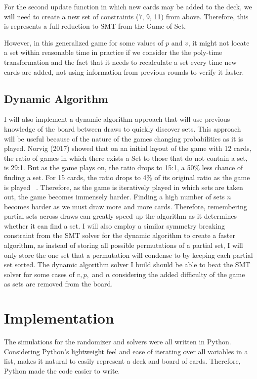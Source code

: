 \documentclass[pageno]{jpaper}
\begin{document}
For the second update function in which new cards may be added to the deck, we will need to create a new set of constraints (7, 9, 11) from above. Therefore, this is represents a full reduction to SMT from the Game of Set. 

However, in this generalized game for some values of $p$ and $v$, it might not locate a set within reasonable time in practice if we consider the the poly-time transformation and the fact that it needs to recalculate a set every time new cards are added, not using information from previous rounds to verify it faster. 

\subsection{Dynamic Algorithm}

I will also implement a dynamic algorithm approach that will use previous knowledge of the board between draws to quickly discover sets. This approach will be useful because of the nature of the games changing probabilities as it is played. Norvig (2017) showed that on an initial layout of the game with 12 cards, the ratio of games in which there exists a Set to those that do not contain a set, is 29:1. But as the game plays on, the ratio drops to 15:1, a 50\% less chance of finding a set. For 15 cards, the ratio drops to 4\% of its original ratio as the game is played ~\cite{norvig}. Therefore, as the game is iteratively played in which sets are taken out, the game becomes immensely harder. Finding a high number of sets $n$ becomes harder as we must draw more and more cards. Therefore, remembering partial sets across draws can greatly speed up the algorithm as it determines whether it can find a set. I will also employ a similar symmetry breaking constraint from the SMT solver for the dynamic algorithm to create a faster algorithm, as instead of storing all possible permutations of a partial set, I will only store the one set that a permutation will condense to by keeping each partial set sorted. The dynamic algorithm solver I build should be able to beat the SMT solver for some cases of $v,p,$ and $n$ considering the added difficulty of the game as sets are removed from the board. 

\section{Implementation}

The simulations for the randomizer and solvers were all written in Python. Considering Python's lightweight feel and ease of iterating over all variables in a list, makes it natural to easily represent a deck and board of cards. Therefore, Python made the code easier to write.
\end{document}
